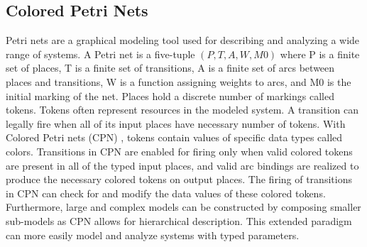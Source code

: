 
\subsection{Colored Petri Nets}

Petri nets \cite{Murata1989} are a graphical modeling tool used for describing and analyzing a wide range of systems. A Petri net is a five-tuple $(P, T, A, W, M0)$ where P is a finite set of places, T is a finite set of transitions, A is a finite set of arcs between places and transitions, W is a function assigning weights to arcs, and M0 is the initial marking of the net. Places hold a discrete number of markings called tokens. Tokens often represent resources in the modeled system. A transition can legally fire when all of its input places have necessary number of tokens. 
With Colored Petri nets (CPN) \cite{CPN}, tokens contain values of specific data types called colors. Transitions in CPN are enabled for firing only when valid colored tokens are present in all of the typed input places, and valid arc bindings are realized to produce the necessary colored tokens on output places. The firing of transitions in CPN can check for and modify the data values of these colored tokens. Furthermore, large and complex models can be constructed by composing smaller sub-models as CPN allows for hierarchical description. This extended paradigm can more easily model and analyze systems with typed parameters. 

